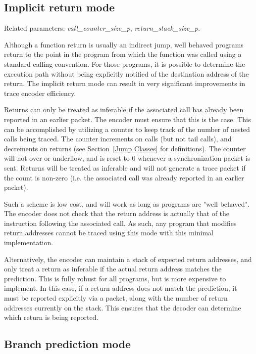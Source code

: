 \subsection{Implicit return mode} \label{sec:implicit-return}

Related parameters: \textit{call\_counter\_size\_p}, \textit{return\_stack\_size\_p}.

Although a function return is usually an indirect jump, well behaved programs return to the
point in the program from which the function was called using a standard calling convention.
For those programs, it is possible to determine the execution path without being explicitly notified
of the destination address of the return.  The implicit return mode can result in very
significant improvements in trace encoder efficiency.

Returns can only be treated as inferable if the associated call has already been reported in
an earlier packet.  The encoder must ensure that this is the case.  This can be accomplished
by utilizing a counter to keep track of the number of nested calls being traced.  The counter
increments on calls (but not tail calls), and decrements on returns (see Section~\ref{Jump Classes}
for definitions).  The counter will not over or underflow, and is reset to 0 whenever a
synchronization packet is sent.  Returns will be treated as inferable and will not generate a trace
packet if the count is non-zero (i.e. the associated call was already reported in an earlier packet).

Such a scheme is low cost, and will work as long as programs are "well behaved".  The encoder does not check that the
return address is actually that of the instruction following the associated call.  As such, any program that
modifies return addresses cannot be traced using this mode with this minimal implementation.

Alternatively, the encoder can maintain a stack of expected return addresses, and only treat a
return as inferable if the actual return address matches the prediction.  This is fully robust for all
programs, but is more expensive to implement.  In this case, if a return address does not match the prediction, 
it must be reported explicitly via a packet, along with the number of return addresses
currently on the stack.  This ensures that the decoder can determine which return is being reported. 

\subsection{Branch prediction mode} \label{sec:branch-prediction}

